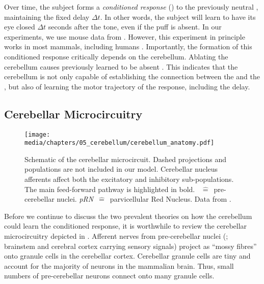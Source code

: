 Over time, the subject forms a \emph{conditioned response} (\CR) to the previously neutral \CS, maintaining the fixed delay $\Delta t$. In other words, the subject will learn to have its eye closed $\Delta t$ seconds after the tone, even if the puff is absent.
In our experiments, we use mouse data from \citet{heiney2014cerebellardependent}.
However, this experiment in principle works in most mammals, including humans \citep{cheng2008neural}.
Importantly, the formation of this conditioned response critically depends on the cerebellum.
Ablating the cerebellum causes previously learned \CRpl to be absent \citep{mccormick1981engram}.
This indicates that the cerebellum is not only capable of establishing the connection between the \CS and the \UR, but also of learning the motor trajectory of the response, including the delay.

\subsection{Cerebellar Microcircuitry}
\label{sec:cerebellum_microcircuit}

\begin{figure}[t]
	\centering
	\texttt{[image: media/chapters/05\_cerebellum/cerebellum\_anatomy.pdf]}
	\caption[Schematic of the cerebellar microcircuit.]{Schematic of the cerebellar microcircuit. Dashed projections and populations are not included in our model. Cerebellar nucleus afferents affect both the excitatory and inhibitory sub-populations.  The main feed-forward pathway is highlighted in bold. \emph{\PCN}~$\hat=$~pre-cerebellar nuclei. \emph{pRN}~$\hat=$~parvicellular Red Nucleus. Data from \citet{ito2010cerebellar,llinas2010olivocerebellar}.}
	\vspace*{-0.5em}
	\label{fig:cerebellum_anatomy}
\end{figure}

Before we continue to discuss the two prevalent theories on how the cerebellum could learn the conditioned response, it is worthwhile to review the cerebellar microcircuitry depicted in .
Afferent nerves from pre-cerebellar nuclei (\PCN; brainstem and cerebral cortex carrying sensory signals) project as \enquote{mossy fibres} onto granule cells in the cerebellar cortex.
Cerebellar granule cells are tiny and account for the majority of neurons in the mammalian brain.
Thus, small numbers of pre-cerebellar neurons connect onto many granule cells.


